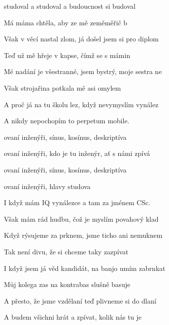 

\zs
{} studoval a studoval a budoucnost si budoval

Má máma chtěla, aby ze mě zeměměřič b

Však v  věcí nastal zlom, já došel jsem si pro diplom

Teď už mě hřeje v kapse, čímž se s mámin  
\ks

\zs
Mé nadání je všestranné, jsem bystrý, moje sestra ne

Však strojařina potkala mě asi omylem

A proč já na tu školu lez, když nevymyslím vynález

A nikdy nepochopím to perpetum mobile.
\ks

\zr
{}ovaní inženýři, sínus, kosínus, deskriptíva

ovaní inženýři, kdo je tu inženýr, ať s námi zpívá

ovaní inženýři, sínus, kosínus, deskriptíva

ovaní inženýři, hlavy studova
\kr

\zs
I když mám IQ vynálezce a tam za jménem CSc.

Však mám rád hudbu, čož je myslím povahový klad

Když rýsujeme za prknem, jsme ticho ani nemuknem

Tak není divu, že si chceme taky zazpívat
\ks

\zs
I když jsem já věd kandidát, na banjo umím zabrnkat

Můj kolega zas na kontrabas slušně basuje

A přesto, že jsme vzdělaní teď plivneme si do dlaní

A budem všichni hrát a zpívat, kolik nás tu je
\ks

\zr  \kr

\kp






















